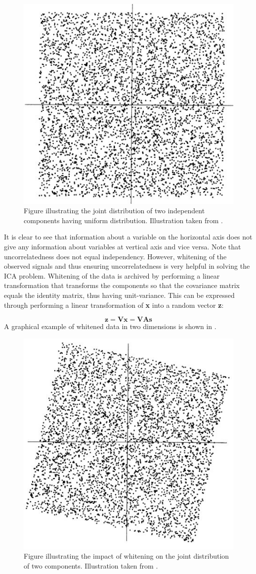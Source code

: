 \begin{figure}[H]                 
	\includegraphics[width=.35\textwidth]{figures/aBackground/independence}  
	\caption{Figure illustrating the joint distribution of two independent components having uniform distribution. Illustration taken from \cite{Hyvarinen2000}.}
	\label{fig:back:independence} 
\end{figure}

It is clear to see that information about a variable on the horizontal axis does not give any information about variables at vertical axis and vice versa.  Note that uncorrelatedness does not equal independency. However, whitening of the observed signals and thus ensuring uncorrelatedness is very helpful in solving the ICA problem. Whitening of the data is archived by performing a linear transformation that transforms the components so that the covariance matrix equals the identity matrix, thus having unit-variance. 
This can be expressed through performing a linear transformation of \textbf{x} into a random vector \textbf{z}:

\begin{equation}
\mathbf{z} = \mathbf{V}\mathbf{x} = \mathbf{V}\mathbf{A}\mathbf{s} 
\end{equation}
A graphical example of whitened data in two dimensions is shown in   \cite{Hyvarinen2001,Hyvarinen2000}.

\begin{figure}[H]                 
	\includegraphics[width=.35\textwidth]{figures/aBackground/whitening}  
	\caption{Figure illustrating the impact of whitening on the joint distribution of two components. Illustration taken from \cite{Hyvarinen2000}.}
	\label{fig:back:whitening} 
\end{figure}

